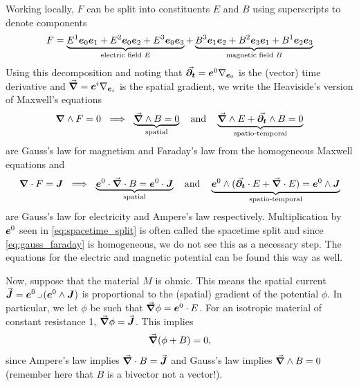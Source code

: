 \documentclass{article}
\begin{document}
Working locally, $F$ can be split into constituents $E$ and $B$ using superscripts to denote components
\begin{align}
	F = \underbrace{E^1 \boldsymbol{e}_0 \boldsymbol{e}_1 + E^2 \boldsymbol{e}_0 \boldsymbol{e}_2 + E^3 \boldsymbol{e}_0 \boldsymbol{e}_3}_{\textrm{electric field } E} + \underbrace{B^{3} \boldsymbol{e}_1 \boldsymbol{e}_2 + B^{2} \boldsymbol{e}_3 \boldsymbol{e}_1 + B^{1} \boldsymbol{e}_2 \boldsymbol{e}_3}_{\textrm{magnetic field } B}
\end{align}
Using this decomposition and noting that $\vec{\boldsymbol{\partial_t}}=\boldsymbol{e}^0 \nabla_{\boldsymbol{e}_0}$ is the (vector) time derivative and  $\vec{\boldsymbol{\nabla}} = \boldsymbol{e}^i \nabla_{\boldsymbol{e}_i}$ is the spatial gradient, we write the Heaviside's version of Maxwell's equations
\begin{align}
\label{eq:gauss_faraday}
	\boldsymbol{\nabla} \wedge F=0 ~\implies~ \underbrace{\vec{\boldsymbol{\nabla}} \wedge B = 0}_{\textrm{spatial}} ~~~\textrm{and}~~~ \underbrace{\vec{\boldsymbol{\nabla}} \wedge E + \vec{\boldsymbol{\partial_t}} \wedge B = 0}_{\textrm{spatio-temporal}}
\end{align}
are Gauss's law for magnetism and Faraday's law from the homogeneous Maxwell equations and
\begin{align}
\label{eq:spacetime_split}
	\boldsymbol{\nabla} \cdot F=\boldsymbol{J}~\implies~ \underbrace{\boldsymbol{e}^0 \cdot \vec{\boldsymbol{\nabla}} \cdot B = \boldsymbol{e}^0 \cdot \boldsymbol{J}}_{\textrm{spatial}}~~~\textrm{and}~~~ \underbrace{\boldsymbol{e}^0 \wedge (\vec{\boldsymbol{\partial_t}} \cdot E + \vec{\boldsymbol{\nabla}} \cdot E) = \boldsymbol{e}^0 \wedge \boldsymbol{J}}_{\textrm{spatio-temporal}}
\end{align}
are Gauss's law for electricity and Ampere's law respectively. Multiplication by $\boldsymbol{e}^0$ seen in \cref{eq:spacetime_split} is often called the spacetime split and since \cref{eq:gauss_faraday} is homogeneous, we do not see this as a necessary step. The equations for the electric and magnetic potential can be found this way as well.

Now, suppose that the material $M$ is ohmic. This means the spatial current $\vec{\boldsymbol{J}}=\boldsymbol{e}^0\hspace*{.5mm}\lrcorner \hspace*{.5mm} (\boldsymbol{e}^0 \wedge \boldsymbol{J})$ is proportional to the (spatial) gradient of the potential $\phi$. In particular, we let $\phi$ be such that $\vec{\boldsymbol{\nabla}}\phi = \boldsymbol{e}^0 \cdot E$. For an isotropic material of constant resistance 1, $\vec{\boldsymbol{\nabla}} \phi = \vec{\boldsymbol{J}}$. This implies
\begin{equation}
    \vec{\boldsymbol{\nabla}} (\phi + B) = 0,
\end{equation}
since Ampere's law implies $\vec{\boldsymbol{\nabla}} \cdot B = \vec{\boldsymbol{J}}$ and Gauss's law implies $\vec{\boldsymbol{\nabla}} \wedge B = 0$ (remember here that $B$ is a bivector not a vector!).
\end{document}
